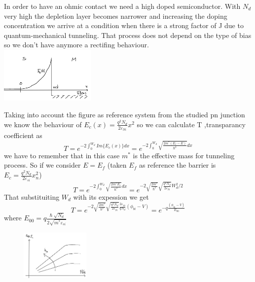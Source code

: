 In order to have an ohmic contact we need a high doped semiconductor. With $N_d$ very high the depletion layer becomes narrower and increasing the doping concentration we arrive at a condition when there is a strong factor of J due to quantum-mechanical tunneling. That process does not depend on the type of bias so we don't have anymore a rectifing behaviour.\\

\centering
\includegraphics[width=0.35\textwidth]{1tunnel.png}\\
\raggedright

Taking into account the figure as reference system from the studied pn junction we know the behaviour of $E_c(x)=\frac{q^2N_d}{2\varepsilon_{Si}}x^2$ so we can calculate T ,transparancy coefficient as 
\begin{equation}
T=e^{-2\int_0^{W_d} Im\{E_c(x)\}dx}=e^{-2\int_0^{W_d} \sqrt{\frac{2m^*(E_c-E)}{\hslash^2}}dx}
\end{equation}
we have to remember that in this case $m^*$ is the effective mass for tunneling process. So if we consider $E=E_f$ (taken $E_f$ as reference the barrier is $E_c=\frac{q^2N_d}{2\varepsilon_{si}}x_n^2$)
\begin{equation}
T=e^{-2\int_0^{W_d} \sqrt{\frac{2m^*E_c}{\hslash^2}}dx}=e^{-2\sqrt{\frac{2m^*}{\hslash^2}}\sqrt{\frac{q^2N_d}{2\varepsilon_{Si}}}W_d^2/2}
\end{equation}
That substituiting $W_d$ with its expession we get
\begin{equation}
T=e^{-2\sqrt{\frac{2m^*}{\hslash^2}}\sqrt{\frac{q^2N_d}{2\varepsilon_{Si}}}\frac{2\varepsilon_{Si}}{qN_d}(\phi_{bi}-V)}=e^{-q \frac{(\phi_{bi}-V)}{E_{00}}}
\end{equation}
where $E_{00}=q\frac{\hslash \sqrt{N_d}}{2\sqrt{m^*\varepsilon_{si}}}$\\

\begin{figure}
\includegraphics[width=0.3\textwidth]{contactrho.png}
\end{figure}

